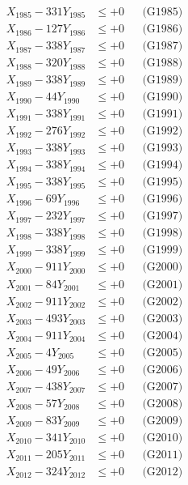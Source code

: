 \documentclass[a4paper,10pt]{article}
\begin{document}
{\begin{align}
X_{1985} - 331Y_{1985} &\leq +0 && \text{(G1985)} \\
X_{1986} - 127Y_{1986} &\leq +0 && \text{(G1986)} \\
X_{1987} - 338Y_{1987} &\leq +0 && \text{(G1987)} \\
X_{1988} - 320Y_{1988} &\leq +0 && \text{(G1988)} \\
X_{1989} - 338Y_{1989} &\leq +0 && \text{(G1989)} \\
X_{1990} - 44Y_{1990} &\leq +0 && \text{(G1990)} \\
\allowbreak
X_{1991} - 338Y_{1991} &\leq +0 && \text{(G1991)} \\
X_{1992} - 276Y_{1992} &\leq +0 && \text{(G1992)} \\
X_{1993} - 338Y_{1993} &\leq +0 && \text{(G1993)} \\
X_{1994} - 338Y_{1994} &\leq +0 && \text{(G1994)} \\
X_{1995} - 338Y_{1995} &\leq +0 && \text{(G1995)} \\
X_{1996} - 69Y_{1996} &\leq +0 && \text{(G1996)} \\
X_{1997} - 232Y_{1997} &\leq +0 && \text{(G1997)} \\
X_{1998} - 338Y_{1998} &\leq +0 && \text{(G1998)} \\
X_{1999} - 338Y_{1999} &\leq +0 && \text{(G1999)} \\
X_{2000} - 911Y_{2000} &\leq +0 && \text{(G2000)} \\
\allowbreak
X_{2001} - 84Y_{2001} &\leq +0 && \text{(G2001)} \\
X_{2002} - 911Y_{2002} &\leq +0 && \text{(G2002)} \\
X_{2003} - 493Y_{2003} &\leq +0 && \text{(G2003)} \\
X_{2004} - 911Y_{2004} &\leq +0 && \text{(G2004)} \\
X_{2005} - 4Y_{2005} &\leq +0 && \text{(G2005)} \\
X_{2006} - 49Y_{2006} &\leq +0 && \text{(G2006)} \\
X_{2007} - 438Y_{2007} &\leq +0 && \text{(G2007)} \\
X_{2008} - 57Y_{2008} &\leq +0 && \text{(G2008)} \\
X_{2009} - 83Y_{2009} &\leq +0 && \text{(G2009)} \\
X_{2010} - 341Y_{2010} &\leq +0 && \text{(G2010)} \\
\allowbreak
X_{2011} - 205Y_{2011} &\leq +0 && \text{(G2011)} \\
X_{2012} - 324Y_{2012} &\leq +0 && \text{(G2012)} \\

\end{align}}
\end{document}
